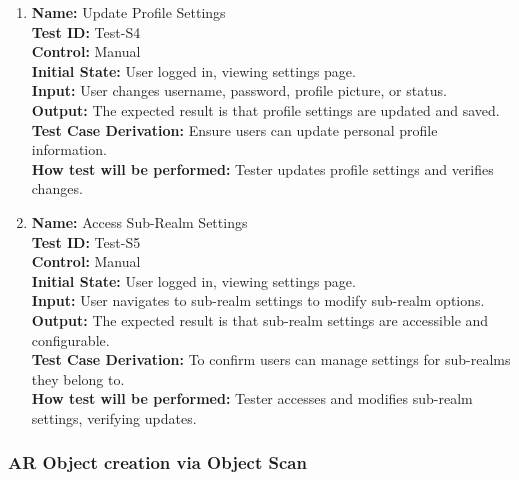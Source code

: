 \documentclass[12pt, titlepage]{article}
\begin{document}
\begin{enumerate}
  \item \textbf{Name:} {Update Profile Settings} \label{itm:Test-S4}\\
        \textbf{Test ID:} Test-S4\\
        \textbf{Control:} Manual \\
        \textbf{Initial State:} User logged in, viewing settings page. \\
        \textbf{Input:} User changes username, password, profile picture, or status. \\
        \textbf{Output:} The expected result is that profile settings are updated and saved. \\
        \textbf{Test Case Derivation:} Ensure users can update personal profile information. \\
        \textbf{How test will be performed:} Tester updates profile settings and verifies changes.

  \item \textbf{Name:} {Access Sub-Realm Settings} \label{itm:Test-S5}\\
        \textbf{Test ID:} Test-S5\\
        \textbf{Control:} Manual \\
        \textbf{Initial State:} User logged in, viewing settings page. \\
        \textbf{Input:} User navigates to sub-realm settings to modify sub-realm options. \\
        \textbf{Output:} The expected result is that sub-realm settings are accessible and configurable. \\
        \textbf{Test Case Derivation:} To confirm users can manage settings for sub-realms they belong to. \\
        \textbf{How test will be performed:} Tester accesses and modifies sub-realm settings, verifying updates.

\end{enumerate}

\subsubsection{AR Object creation via Object Scan}
\end{document}

